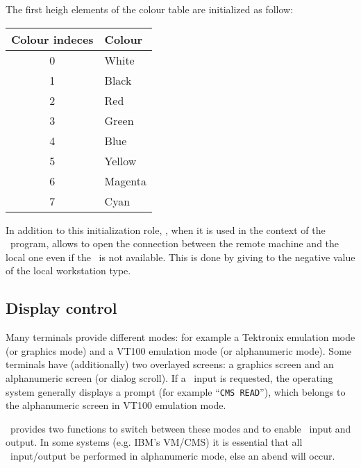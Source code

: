 \par
{}
The first heigh elements of the colour table are initialized as follow:
\begin{center}
\begin{tabular}{||c|l||}
\hline
 Colour indeces              & Colour                 \\
\hline
            0                & White                  \\
            1                & Black                  \\
            2                & Red                    \\
            3                & Green                  \\
            4                & Blue                   \\
            5                & Yellow                 \\
            6                & Magenta                \\
            7                & Cyan                   \\
\hline
\end{tabular}
\end{center}
 
In addition to this initialization role, , when it is used in the
context of the \TELNETG~program, allows to open the connection between the
remote machine and the local one even if the \XW~is not available.
This is done by giving to  the negative value of the local
workstation type.
\subsection{Display control}
\par
Many terminals provide different modes: for example a Tektronix emulation mode
(or graphics mode) and a VT100 emulation mode (or alphanumeric mode). Some
terminals have (additionally) two overlayed screens: a graphics screen and an
alphanumeric screen (or dialog scroll). If a \FORTRAN~input is requested, the
operating system generally displays a prompt (for example ``{\tt CMS READ}''),
which belongs to the alphanumeric screen in VT100 emulation mode.
\par
\HIGZ~provides two functions to switch between these modes and to enable
\FORTRAN~input and output. In some systems (e.g. IBM's VM/CMS) it is essential
that all \FORTRAN~input/output be performed in alphanumeric mode, else an
abend will occur.

